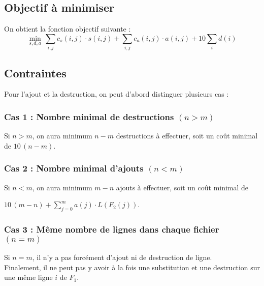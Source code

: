 \documentclass[a4paper, 10pt, french]{article}
\begin{document}
\subsection*{Objectif à minimiser}

On obtient la fonction objectif suivante :
\begin{equation*}
\min_{s, d, a} \, \sum\limits_{i,j} c_s(i, j) \cdot s(i, j) + \sum\limits_{i,j} c_a(i, j) \cdot a(i, j) + 10 \sum\limits_i d(i)
\end{equation*}

\subsection*{Contraintes}
\indent Pour l'ajout et la destruction, on peut d'abord distinguer plusieurs cas :

\subsubsection*{Cas 1 : Nombre minimal de destructions $(n > m)$}

Si $n > m$, on aura minimum $n-m$ destructions à effectuer, soit un coût minimal de $10 \, (n - m)$.


\subsubsection*{Cas 2 : Nombre minimal d'ajouts $(n < m)$}

Si $n < m$, on aura minimum $m - n$ ajouts à effectuer, soit un coût minimal de

$10 \, (m - n) + \sum\limits_{j=0}^m a(j) \cdot L(F_2(j))$.


\subsubsection*{Cas 3 : Même nombre de lignes dans chaque fichier $(n = m)$}

Si $n = m$, il n'y a pas forcément d'ajout ni de destruction de ligne.
\\

\noindent Finalement, il ne peut pas y avoir à la fois une substitution et une destruction sur une même ligne $i$ de $F_1$.
\\


\end{document}
